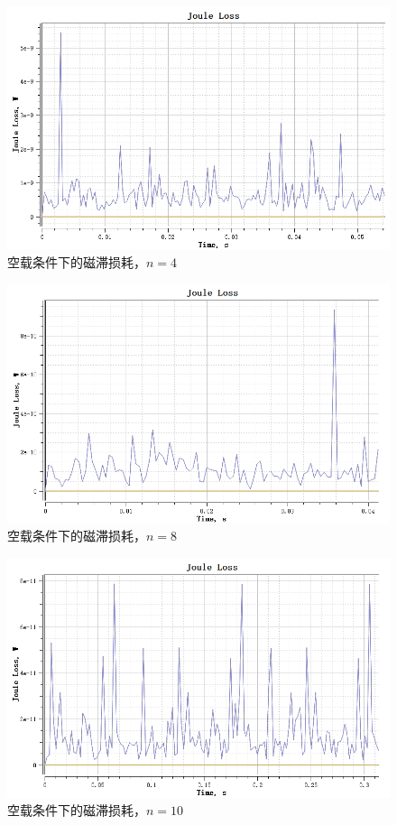 \documentclass{thuemp}
\begin{document}
\begin{figure}[H]
  \centering
  \includegraphics[width=1\linewidth]{./img/task3/joule-n4.png}
  \caption{空载条件下的磁滞损耗，$n=4$}
\end{figure}
\begin{figure}[H]
  \centering
  \includegraphics[width=1\linewidth]{./img/task3/joule-n8.png}
  \caption{空载条件下的磁滞损耗，$n=8$}
\end{figure}
\begin{figure}[H]
  \centering
  \includegraphics[width=1\linewidth]{./img/task3/joule-n10.png}
  \caption{空载条件下的磁滞损耗，$n=10$}
\end{figure}
\end{document}
